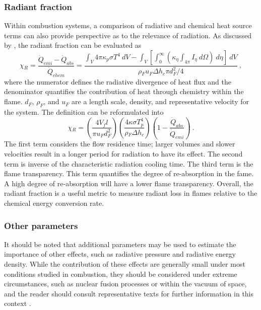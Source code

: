 \subsubsection{Radiant fraction}
Within combustion systems, a comparison of radiative and chemical heat source terms can also provide perspective as to the relevance of radiation. As discussed by \citet{Liu2020TheFlames}, the radiant fraction can be evaluated as
\begin{equation}
    \chi{}_R=\frac{\dot{Q}_{emi}-\dot{Q}_{abs}}{\dot{Q}_{chem}}=\frac{\int_V{4\pi{}\kappa{}_p\sigma{}T^4~dV}-\int_V\left[\int_0^\infty{\left(\kappa{}_\eta{}\int_{4\pi}I_\eta{}~d\Omega\right)~d\eta{}}\right]~dV}{\rho{}_Fu_F\Delta{h}_c\pi{}d_F^2/4} \ ,
    \label{eq:RadiantFraction}
\end{equation}
where the numerator defines the radiative divergence of heat flux and the denominator quantifies the contribution of heat through chemistry within the flame. $d_F$, $\rho_F$, and $u_F$ are a length scale, density, and representative velocity for the system.
The definition can be reformulated into 
\begin{equation}
    \chi{}_R=\left(\frac{4V_fl}{\pi{}u_Fd_F^2}\right)\left(\frac{4\kappa{}\sigma{}T_p^4}{\rho{}_F\Delta{h}_c}\right)\left(1-\frac{\dot{Q}_{abs}}{\dot{Q}_{emi}}\right) \ .
    \label{eq:RadiantFraction_reformulated}
\end{equation}
The first term considers the flow residence time; larger volumes and slower velocities result in a longer period for radiation to have its effect.
The second term is inverse of the characteristic radiation cooling time. 
The third term is the flame transparency. This term quantifies the degree of re-absorption in the fame. A high degree of re-absorption will have a lower flame transparency. Overall, the radiant fraction is a useful metric to measure radiant loss in flames relative to the chemical energy conversion rate.

\subsubsection{Other parameters}
It should be noted that additional parameters may be used to estimate the importance of other effects, such as radiative pressure and radiative energy density.
While the contribution of these effects are generally small under most conditions studied in combustion, they should be considered under extreme circumstances, such as nuclear fusion processes or within the vacuum of space, and the reader should consult representative texts for further information in this context \cite{Pai1966RadiationDynamics}.

